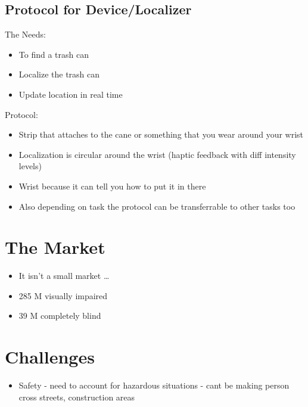 \documentclass[12pt,letterpaper]{article}
\begin{document}
\subsection*{Protocol for Device/Localizer}
The Needs:
\newline
\begin{itemize}
    \item To find a trash can
    \item Localize the trash can
    \item Update location in real time
\end{itemize}
Protocol:
\newline
\begin{itemize}
    \item Strip that attaches to the cane or something that you wear around your wrist
    \item Localization is circular around the wrist (haptic feedback with diff intensity levels)
    \item Wrist because it can tell you how to put it in there 
    \item Also depending on task the protocol can be transferrable to other tasks too
\end{itemize}

\section*{The Market}
\begin{itemize}
    \item It isn’t a small market … 
    \item 285 M visually impaired
    \item 39 M completely blind
\end{itemize}

\section*{Challenges}
\begin{itemize}
    \item Safety - need to account for hazardous situations - cant be making person cross streets, construction areas
\end{itemize}
\end{document}
